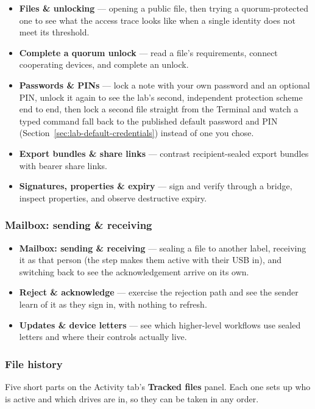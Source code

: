 \begin{itemize}
  \item \textbf{Files \& unlocking} --- opening a public file, then trying
  a quorum-protected one to see what the access trace looks like when a
  single identity does not meet its threshold.
  \item \textbf{Complete a quorum unlock} --- read a file's requirements,
  connect cooperating devices, and complete an unlock.
  \item \textbf{Passwords \& PINs} --- lock a note with your own password
  and an optional PIN, unlock it again to see the lab's second, independent
  protection scheme end to end, then lock a second file straight from the
  Terminal and watch a typed command fall back to the published default
  password and PIN (Section~\ref{sec:lab-default-credentials}) instead of
  one you chose.
  \item \textbf{Export bundles \& share links} --- contrast
  recipient-sealed export bundles with bearer share links.
  \item \textbf{Signatures, properties \& expiry} --- sign and verify
  through a bridge, inspect properties, and observe destructive expiry.
\end{itemize}

\subsubsection{Mailbox: sending \& receiving}

\begin{itemize}
  \item \textbf{Mailbox: sending \& receiving} --- sealing a file to
  another label, receiving it as that person (the step makes them active
  with their USB in), and switching back to see the acknowledgement arrive
  on its own.
  \item \textbf{Reject \& acknowledge} --- exercise the rejection path
  and see the sender learn of it as they sign in, with nothing to refresh.
  \item \textbf{Updates \& device letters} --- see which higher-level
  workflows use sealed letters and where their controls actually live.
\end{itemize}

\subsubsection{File history}

Five short parts on the Activity tab's \textbf{Tracked files} panel. Each
one sets up who is active and which drives are in, so they can be taken in
any order.


